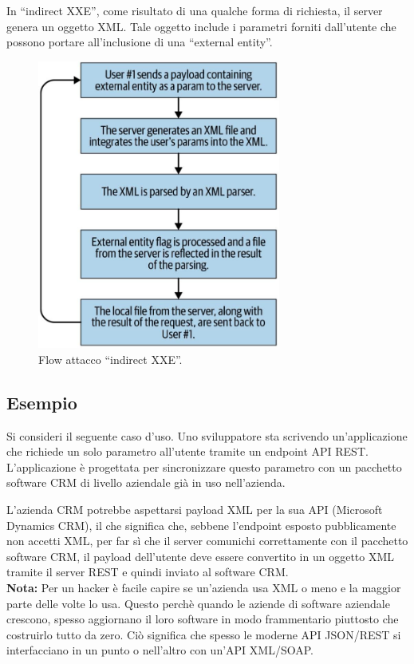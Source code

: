 In ``indirect XXE'', come risultato di una qualche forma
di richiesta, il server genera un oggetto XML. Tale oggetto include i parametri forniti dall'utente che possono portare all'inclusione di una ``external entity''.

\begin{figure}[H]
	\centering
	\includegraphics[width=8cm, keepaspectratio]{capitoli/web_security/imgs/indirect_xxe_flow.png}
	\caption{Flow attacco ``indirect XXE''.}
	\label{fig:indirect_xxe_flow}
\end{figure}

\newpage

\subsection{Esempio}

Si consideri il seguente caso d'uso. Uno sviluppatore sta scrivendo un'applicazione che richiede un solo parametro all'utente tramite un endpoint API REST. L'applicazione è progettata per sincronizzare questo parametro con un pacchetto software CRM di livello aziendale già in uso nell'azienda.

L'azienda CRM potrebbe aspettarsi payload XML per la sua API (Microsoft Dynamics CRM), il che significa che, sebbene l'endpoint esposto pubblicamente non accetti XML, per far sì che il server comunichi correttamente con il pacchetto software CRM, il payload dell'utente deve essere convertito in un oggetto XML tramite il server REST e quindi inviato al software CRM.\\

\textbf{Nota:} Per un hacker è facile capire se un'azienda usa XML o meno e la maggior parte delle volte lo usa. Questo perchè quando le aziende di software aziendale crescono, spesso aggiornano il loro software in modo frammentario piuttosto che costruirlo tutto da zero. Ciò significa che spesso le moderne API JSON/REST si interfacciano in un punto o nell'altro con un'API XML/SOAP.